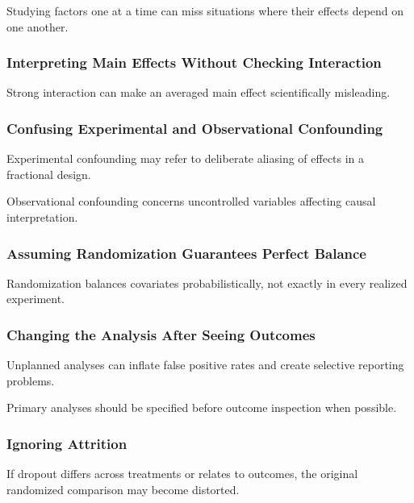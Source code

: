 Studying factors one at a time can miss situations where their effects
depend on one another.

\subsubsection{Interpreting Main Effects Without Checking Interaction}

Strong interaction can make an averaged main effect scientifically
misleading.

\subsubsection{Confusing Experimental and Observational Confounding}

Experimental confounding may refer to deliberate aliasing of effects in a
fractional design.

Observational confounding concerns uncontrolled variables affecting
causal interpretation.

\subsubsection{Assuming Randomization Guarantees Perfect Balance}

Randomization balances covariates probabilistically, not exactly in every
realized experiment.

\subsubsection{Changing the Analysis After Seeing Outcomes}

Unplanned analyses can inflate false positive rates and create selective
reporting problems.

Primary analyses should be specified before outcome inspection when
possible.

\subsubsection{Ignoring Attrition}

If dropout differs across treatments or relates to outcomes, the original
randomized comparison may become distorted.

